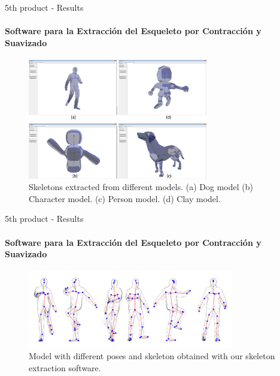 \documentclass[10pt, compress, english]{beamer}
\begin{document}
\begin{frame}{5th product - Results}


\framesubtitle{Software para la Extracción del Esqueleto por Contracción y Suavizado}


\begin{figure}[H]
\begin{centering}
\includegraphics[width=0.7\textwidth]{img/Skeletonizer_2}
\par\end{centering}

\protect\caption{Skeletons extracted from different models. (a) Dog model (b) Character
model. (c) Person model. (d) Clay model.}
\end{figure}


\end{frame}
 

\begin{frame}{5th product - Results}


\framesubtitle{Software para la Extracción del Esqueleto por Contracción y Suavizado}


\begin{figure}[H]
\includegraphics[width=0.8\textwidth]{img/poses}

\protect\caption{Model with different poses and skeleton obtained with our skeleton
extraction software.}
\end{figure}


\end{frame}
\end{document}

